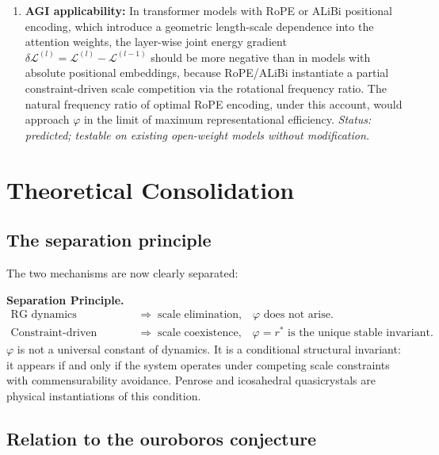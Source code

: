 \documentclass[11pt,a4paper]{article}
\theoremstyle{plain}
\theoremstyle{definition}
\newcommand{\phiGolden}{\varphi}
\begin{document}
\begin{enumerate}[label=\textbf{P\arabic*.}, leftmargin=*, itemsep=6pt]
  \item \textbf{AGI applicability:}
    In transformer models with RoPE or ALiBi positional encoding,
    which introduce a geometric length-scale dependence into the attention
    weights, the layer-wise joint energy gradient
    $\delta\mathcal{L}^{(l)} = \mathcal{L}^{(l)} - \mathcal{L}^{(l-1)}$
    should be more negative than in models with absolute positional
    embeddings, because RoPE/ALiBi instantiate a partial constraint-driven
    scale competition via the rotational frequency ratio. The natural
    frequency ratio of optimal RoPE encoding, under this account, would
    approach $\phiGolden$ in the limit of maximum representational
    efficiency.
    \emph{Status: predicted; testable on existing open-weight models
    without modification.}

\end{enumerate}

\section{Theoretical Consolidation}
\label{sec:theory}

\subsection{The separation principle}

The two mechanisms are now clearly separated:

\begin{keybox}
\textbf{Separation Principle.}
\begin{align*}
\text{RG dynamics} \;&\Rightarrow\; \text{scale elimination,}
  \quad \phiGolden \text{ does not arise.} \\
\text{Constraint-driven dynamics} \;&\Rightarrow\;
  \text{scale coexistence,} \quad
  \phiGolden = r^* \text{ is the unique stable invariant.}
\end{align*}
$\phiGolden$ is not a universal constant of dynamics. It is a conditional
structural invariant: it appears if and only if the system operates under
competing scale constraints with commensurability avoidance. Penrose and
icosahedral quasicrystals are physical instantiations of this condition.
\end{keybox}

\subsection{Relation to the ouroboros conjecture}
\end{document}
